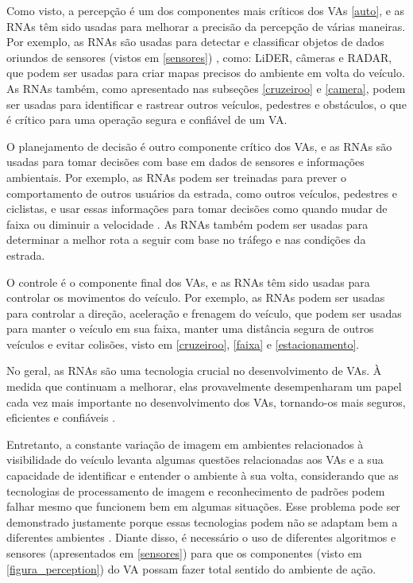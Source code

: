 Como visto, a percepção é um dos componentes mais críticos dos VAs \ref{auto}, e as RNAs têm sido usadas para melhorar a precisão da percepção de várias maneiras. 
Por exemplo, as  RNAs são usadas para detectar e classificar objetos de dados oriundos de sensores (vistos em \ref{sensores}) , como: LiDER, câmeras e RADAR, que podem ser usadas para criar mapas precisos do ambiente em volta do veículo. 
As RNAs também, como apresentado nas subseções \ref{cruzeiroo} e \ref{camera}, podem ser usadas para identificar e rastrear outros veículos, pedestres e obstáculos, o que é crítico para uma operação segura e confiável de um VA.

O planejamento de decisão é outro componente crítico dos VAs, e as  RNAs são usadas para tomar decisões com base em dados de sensores e informações ambientais. Por exemplo, as RNAs podem ser treinadas para prever o comportamento de outros usuários da estrada, como outros veículos, pedestres e ciclistas, e usar essas informações para tomar decisões como quando mudar de faixa ou diminuir a velocidade \cite{aplicacao2}. As RNAs também podem ser usadas para determinar a melhor rota a seguir com base no tráfego e nas condições da estrada. 

O controle é o componente final dos VAs, e as RNAs têm sido usadas para controlar os movimentos do veículo. Por exemplo, as  RNAs podem ser usadas para controlar a direção, aceleração e frenagem do veículo, que podem ser usadas para manter o veículo em sua faixa, manter uma distância segura de outros veículos e evitar colisões, visto em \ref{cruzeiroo}, \ref{faixa} e \ref{estacionamento}.

No geral, as RNAs são uma tecnologia crucial no desenvolvimento de VAs. À medida que continuam a melhorar, elas provavelmente desempenharam um papel cada vez mais importante no desenvolvimento dos VAs, tornando-os mais seguros, eficientes e confiáveis \cite{sensors-yet, aplicacao2}.


Entretanto, a constante variação de imagem em ambientes relacionados à visibilidade do veículo levanta algumas questões relacionadas aos VAs e a sua capacidade de identificar e entender o ambiente à sua volta, considerando que as tecnologias de processamento de imagem e reconhecimento de padrões podem falhar mesmo que funcionem bem em algumas situações. Esse problema pode ser demonstrado justamente porque essas tecnologias podem não se adaptam bem a diferentes ambientes \cite{caio}. Diante disso, é necessário o uso de diferentes algoritmos e sensores (apresentados em \ref{sensores}) para que os componentes (visto em \ref{figura_perception}) do VA possam fazer total sentido do ambiente de ação.

